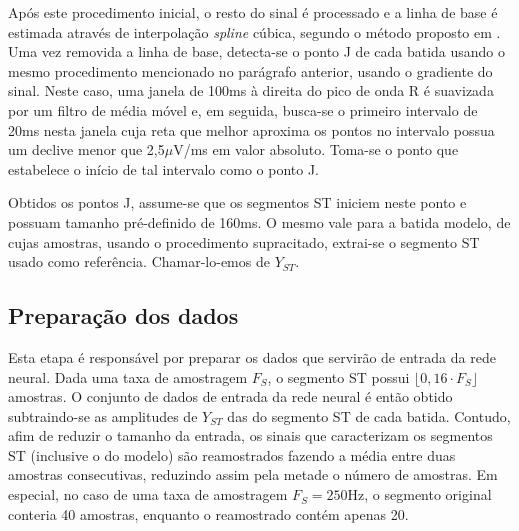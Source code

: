 Após este procedimento inicial, o resto do sinal é processado e a linha de base é estimada através de interpolação \emph{spline} cúbica, segundo o método proposto em \cite{Badilini91}. Uma vez removida a linha de base, detecta-se o ponto J de cada batida usando o mesmo procedimento mencionado no parágrafo anterior, usando o gradiente do sinal. Neste caso, uma janela de 100ms à direita do pico de onda R é suavizada por um filtro de média móvel e, em seguida, busca-se o primeiro intervalo de 20ms nesta janela cuja reta que melhor aproxima os pontos no intervalo possua um declive menor que 2,5$\mu$V/ms em valor absoluto. Toma-se o ponto que estabelece o início de tal intervalo como o ponto J.

Obtidos os pontos J, assume-se que os segmentos ST iniciem neste ponto e possuam tamanho pré-definido de 160ms. O mesmo vale para a batida modelo, de cujas amostras, usando o procedimento supracitado, extrai-se o segmento ST usado como referência. Chamar-lo-emos de $Y_{ST}$.

\subsection{Preparação dos dados}
Esta etapa é responsável por preparar os dados que servirão de entrada da rede neural. Dada uma taxa de amostragem $F_S$, o segmento ST possui $\lfloor0,16\cdot F_S\rfloor$ amostras. O conjunto de dados de entrada da rede neural é então obtido subtraindo-se as amplitudes de $Y_{ST}$ das do segmento ST de cada batida. Contudo, afim de reduzir o tamanho da entrada, os sinais que caracterizam os segmentos ST (inclusive o do modelo) são reamostrados fazendo a média entre duas amostras consecutivas, reduzindo assim pela metade o número de amostras. Em especial, no caso de uma taxa de amostragem $F_S = 250\mathrm{Hz}$, o segmento original conteria 40 amostras, enquanto o reamostrado contém apenas 20.
